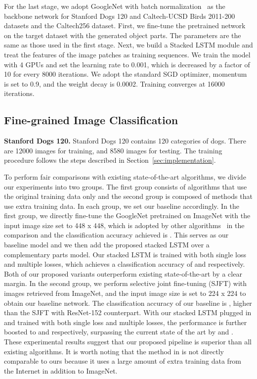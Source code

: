 \documentclass[10pt,twocolumn,letterpaper]{article}
\begin{document}
For the last stage, we adopt GoogleNet with batch normalization~\cite{Sergey2015batchnorm} as the backbone network for Stanford Dogs 120 and Caltech-UCSD Birds 2011-200 datasets and the Caltech256 dataset. First, we fine-tune the pretrained network on the target dataset with the generated object parts. The parameters are the same as those used in the first stage. Next, we build a Stacked LSTM module and treat the features of the  image patches as training sequences. We train the model with 4 GPUs and set the learning rate to 0.001, which is decreased by a factor of 10 for every 8000 iterations. We adopt the standard SGD optimizer, momentum is set to 0.9, and the weight decay is 0.0002. Training converges at 16000 iterations.



\subsection{Fine-grained Image Classification}
\noindent\textbf{Stanford Dogs 120.} Stanford Dogs 120 contains 120 categories of dogs. There are 12000 images for training, and 8580 images for testing. The training procedure follows the steps described in Section~\ref{sec:implementation}. 

To perform fair comparisons with existing state-of-the-art algorithms, we divide our experiments into two groups. The first group consists of algorithms that use the original training data only and the second group is composed of methods that use extra training data. In each group, we set our baseline accordingly. In the first group, we directly fine-tune the GoogleNet pretrained on ImageNet with the input image size set to 448 x 448, which is adopted by other algorithms~\cite{jianf17, Liu16FCAN, sun18} in the comparison and the classification accuracy achieved is . This serves as our baseline model and we then add the proposed stacked LSTM over a complementary parts model. Our stacked LSTM is trained with both single loss and multiple losses, which achieves a classification accuracy of  and  respectively. Both of our proposed variants outerperform existing state-of-the-art by a clear margin. In the second group, we perform selective joint fine-tuning (SJFT) with images retrieved from ImageNet, and the input image size is set to 224 x 224 to obtain our baseline network. The classification accuracy of our baseline is ,  higher than the SJFT with ResNet-152 counterpart. With our stacked LSTM plugged in and trained with both single loss and multiple losses, the performance is further boosted to  and  respectively, surpassing the current state of the art by  and . These experimental results suggest that our proposed pipeline is superior than all existing algorithms. It is worth noting that the method in \cite{krause2015unreasonable} is not directly comparable to ours because it uses a large amount of extra training data from the Internet in addition to ImageNet.
\end{document}
